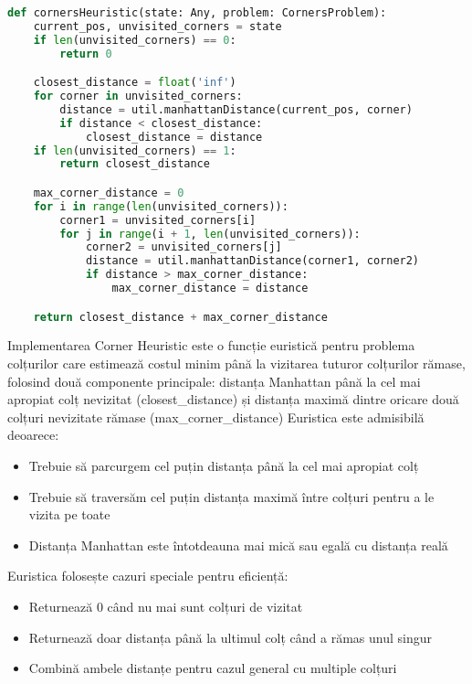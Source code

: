 \documentclass[12pt,a4paper]{article}
\begin{document}
\begin{lstlisting}[language=Python]
def cornersHeuristic(state: Any, problem: CornersProblem):
    current_pos, unvisited_corners = state
    if len(unvisited_corners) == 0:
        return 0

    closest_distance = float('inf')
    for corner in unvisited_corners:
        distance = util.manhattanDistance(current_pos, corner)
        if distance < closest_distance:
            closest_distance = distance
    if len(unvisited_corners) == 1:
        return closest_distance

    max_corner_distance = 0
    for i in range(len(unvisited_corners)):
        corner1 = unvisited_corners[i]
        for j in range(i + 1, len(unvisited_corners)):
            corner2 = unvisited_corners[j]
            distance = util.manhattanDistance(corner1, corner2)
            if distance > max_corner_distance:
                max_corner_distance = distance

    return closest_distance + max_corner_distance
\end{lstlisting}

Implementarea Corner Heuristic este o funcție euristică pentru problema colțurilor care estimează costul minim până la vizitarea tuturor colțurilor rămase, folosind două componente principale: distanța Manhattan până la cel mai apropiat colț nevizitat (closest\_distance) și distanța maximă dintre oricare două colțuri nevizitate rămase (max\_corner\_distance)
Euristica este admisibilă deoarece:
\begin{itemize}
    \item Trebuie să parcurgem cel puțin distanța până la cel mai apropiat colț
    \item Trebuie să traversăm cel puțin distanța maximă între colțuri pentru a le vizita pe toate
    \item Distanța Manhattan este întotdeauna mai mică sau egală cu distanța reală \newline
\end{itemize}

Euristica folosește cazuri speciale pentru eficiență:
\begin{itemize}
    \item Returnează 0 când nu mai sunt colțuri de vizitat
    \item Returnează doar distanța până la ultimul colț când a rămas unul singur
    \item Combină ambele distanțe pentru cazul general cu multiple colțuri
\end{itemize}
\end{document}
